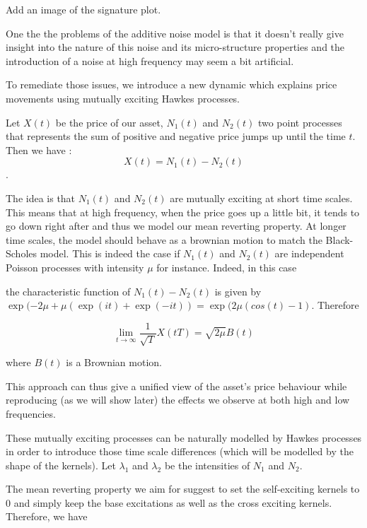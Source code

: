 \documentclass[a4paper,12pt,twoside]{article}
\begin{document}
Add an image of the signature plot.

One the the problems of the additive noise model is that it doesn't really give insight into the nature of this noise and its micro-structure properties and the introduction of a noise at high frequency may seem a bit artificial.

To remediate those issues, we introduce a new dynamic which explains price movements using mutually exciting Hawkes processes.

Let $X(t)$ be the price of our asset, $N_1(t)$ and $N_2(t)$ two point processes that represents the sum of positive and negative price jumps up until the time $t$. Then we have : \begin{equation} X(t) = N_1(t) - N_2(t) \end{equation}. 

The idea is that $N_1(t)$ and $N_2(t)$ are mutually exciting at short time scales. This means that at high frequency, when the price goes up a little bit, it tends to go down right after and thus we model our mean reverting property. At longer time scales, the model should behave as a brownian motion to match the Black-Scholes model. This is indeed the case if $N_1(t)$ and $N_2(t)$ are independent Poisson processes with intensity $\mu$ for instance.
Indeed, in this case 

the characteristic function of $N_1(t) - N_2(t)$ is given by $\exp(-2\mu + \mu(\exp(it) + \exp(-it)) = \exp(2\mu(cos(t) - 1)$. Therefore 

\begin{equation}
\lim_{t \to \infty} \frac{1}{\sqrt{T}}X(tT) = \sqrt{2\mu}B(t)
\end{equation}

where $B(t)$ is a Brownian motion.

This approach can thus give a unified view of the asset's price behaviour while reproducing (as we will show later) the effects we observe at both high and low frequencies.

These mutually exciting processes can be naturally modelled by Hawkes processes in order to introduce those time scale differences (which will be modelled by the shape of the kernels). Let $\lambda_1$ and $\lambda_2$ be the intensities of $N_1$ and $N_2$. 

The mean reverting property we aim for suggest to set the self-exciting kernels to 0 and simply keep the base excitations as well as the cross exciting kernels. Therefore, we have 
\end{document}

